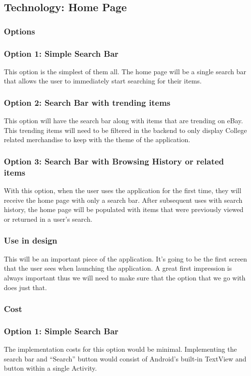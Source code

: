 \documentclass[journal,compsoc, 10pt, draftclsnofoot, onecolumn]{IEEEtran}
\begin{document}
\subsection{Technology: Home Page}
\subsubsection{Options}
\subsubsection*{Option 1: Simple Search Bar}
This option is the simplest of them all. The home page will be a single search 
bar that allows the user to immediately start searching for their items. 
\subsubsection*{Option 2: Search Bar with trending items}
This option will have the search bar along with items that are trending on eBay. 
This trending items will need to be filtered in the backend to only display College related merchandise to keep with the theme of the application. 
\subsubsection*{Option 3: Search Bar with Browsing History or related items}
With this option, when the user uses the application for the first time, they 
will receive the home page with only a search bar. After subsequent uses with 
search history, the home page will be populated with items that were previously 
viewed or returned in a user's search.  
\subsubsection{Use in design}
This will be an important piece of the application. It's going to be the first 
screen that the user sees when launching the application. A great first 
impression is always important thus we will need to make sure that the option 
that we go with does just that.
\subsubsection{Cost}
\subsubsection*{Option 1: Simple Search Bar}
The implementation costs for this option would be minimal. Implementing the 
search bar and ``Search'' button would consist of Android's built-in TextView 
and button within a single Activity. 
\end{document}
